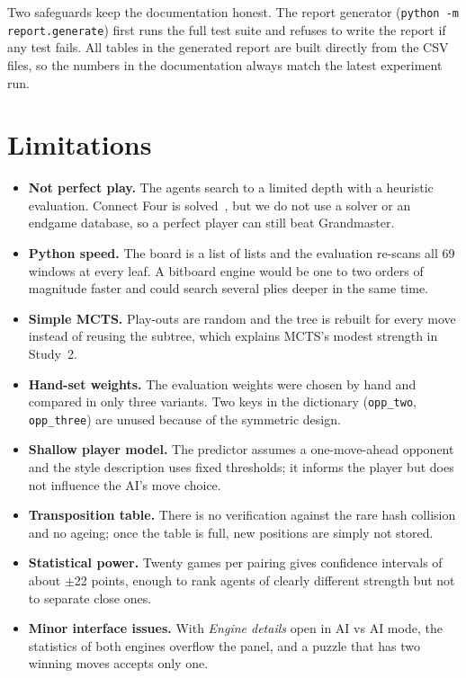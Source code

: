 \documentclass[11pt,a4paper]{article}
\newcommand{\code}[1]{\texttt{\small #1}}
\begin{document}
Two safeguards keep the documentation honest. The report generator (\code{python -m report.generate}) first runs the full test suite and refuses to write the report if any test fails. All tables in the generated report are built directly from the CSV files, so the numbers in the documentation always match the latest experiment run.

\section{Limitations}\label{sec:limits}

\begin{itemize}
  \item \textbf{Not perfect play.} The agents search to a limited depth with a heuristic evaluation. Connect Four is solved~\cite{allis1988}, but we do not use a solver or an endgame database, so a perfect player can still beat Grandmaster.
  \item \textbf{Python speed.} The board is a list of lists and the evaluation re-scans all 69 windows at every leaf. A bitboard engine would be one to two orders of magnitude faster and could search several plies deeper in the same time.
  \item \textbf{Simple MCTS.} Play-outs are random and the tree is rebuilt for every move instead of reusing the subtree, which explains MCTS's modest strength in Study~2.
  \item \textbf{Hand-set weights.} The evaluation weights were chosen by hand and compared in only three variants. Two keys in the dictionary (\code{opp\_two}, \code{opp\_three}) are unused because of the symmetric design.
  \item \textbf{Shallow player model.} The predictor assumes a one-move-ahead opponent and the style description uses fixed thresholds; it informs the player but does not influence the AI's move choice.
  \item \textbf{Transposition table.} There is no verification against the rare hash collision and no ageing; once the table is full, new positions are simply not stored.
  \item \textbf{Statistical power.} Twenty games per pairing gives confidence intervals of about $\pm$22 points, enough to rank agents of clearly different strength but not to separate close ones.
  \item \textbf{Minor interface issues.} With \emph{Engine details} open in AI vs AI mode, the statistics of both engines overflow the panel, and a puzzle that has two winning moves accepts only one.
\end{itemize}
\end{document}
